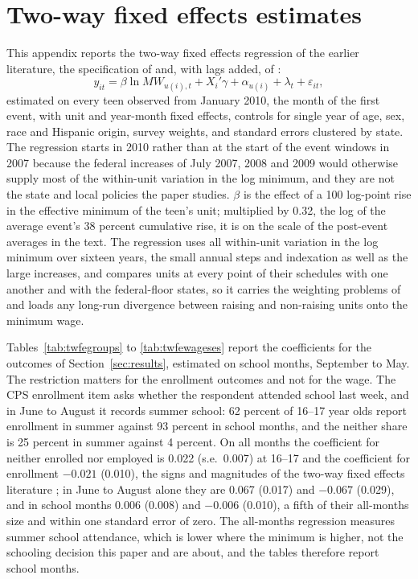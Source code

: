 \documentclass[12pt]{article}
\begin{document}
\clearpage
\section{Two-way fixed effects estimates}\label{app:twfe}

This appendix reports the two-way fixed effects regression of the earlier literature, the specification of \citet{neumark2019} and, with lags added, of \citet{smith2021}:
\begin{equation}
y_{it} = \beta \ln MW_{u(i),t} + X_i'\gamma + \alpha_{u(i)} + \lambda_t + \varepsilon_{it},
\label{eq:twfe}
\end{equation}
estimated on every teen observed from January 2010, the month of the first event, with unit and year-month fixed effects, controls for single year of age, sex, race and Hispanic origin, survey weights, and standard errors clustered by state. The regression starts in 2010 rather than at the start of the event windows in 2007 because the federal increases of July 2007, 2008 and 2009 would otherwise supply most of the within-unit variation in the log minimum, and they are not the state and local policies the paper studies. $\beta$ is the effect of a 100 log-point rise in the effective minimum of the teen's unit; multiplied by 0.32, the log of the average event's 38 percent cumulative rise, it is on the scale of the post-event averages in the text. The regression uses all within-unit variation in the log minimum over sixteen years, the small annual steps and indexation as well as the large increases, and compares units at every point of their schedules with one another and with the federal-floor states, so it carries the weighting problems of \citet{goodmanbacon2021} and loads any long-run divergence between raising and non-raising units onto the minimum wage.

Tables~\ref{tab:twfegroups} to \ref{tab:twfewageses} report the coefficients for the outcomes of Section~\ref{sec:results}, estimated on school months, September to May. The restriction matters for the enrollment outcomes and not for the wage. The CPS enrollment item asks whether the respondent attended school last week, and in June to August it records summer school: 62 percent of 16--17 year olds report enrollment in summer against 93 percent in school months, and the neither share is 25 percent in summer against 4 percent. On all months the coefficient for neither enrolled nor employed is 0.022 (s.e.\ 0.007) at 16--17 and the coefficient for enrollment $-0.021$ (0.010), the signs and magnitudes of the two-way fixed effects literature \citep{neumark1995a,neumark2019}; in June to August alone they are 0.067 (0.017) and $-0.067$ (0.029), and in school months 0.006 (0.008) and $-0.006$ (0.010), a fifth of their all-months size and within one standard error of zero. The all-months regression measures summer school attendance, which is lower where the minimum is higher, not the schooling decision this paper and \citet{smith2021} are about, and the tables therefore report school months.
\end{document}
